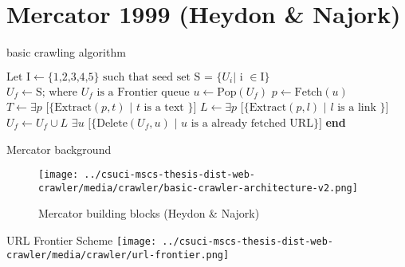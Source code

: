 \documentclass[9pt]{beamer}
\begin{document}

\section[Mercator]{Mercator 1999 (Heydon \& Najork)}
\begin{frame}[plain]
\end{frame}


\begin{frame}{basic crawling algorithm}
  \begin{algorithm}[H]
    \begin{algorithmic}[1]
      \State $\text{Let I} \gets \text{\{1,2,3,4,5\}} \text{ such that seed set S = \{} U_i \text{| i } \in \text{I\}}$
      \State $U_f \gets \text{S; where } U_f \text{ is a Frontier queue}$
      \State $u \gets \text{Pop}(U_f)$ 
      \State $p \gets \text{Fetch}(u)$
      \State $T \gets \exists p\text{ [\{Extract}(p, t) \text{ | } t \text{ is a text \}]}$
      \State $L \gets \exists p\text{ [\{Extract}(p, l) \text{ | } l \text{ is a link \}]}$
      \State $U_f \gets U_f \cup L$
      \State $\exists u\text{ [\{Delete}(U_f, u) \text{ | } u \text{ is a already fetched URL\}]}$
      \EndWhile
      \EndProcedure
      \State \textbf{end}
    \end{algorithmic}
  \end{algorithm}
\end{frame}


\begin{frame}{Mercator background}
  \centering
  \begin{figure}
  \texttt{[image: ../csuci-mscs-thesis-dist-web-crawler/media/crawler/basic-crawler-architecture-v2.png]}
  \caption{Mercator building blocks (Heydon \& Najork)}
  \end{figure}
\end{frame}


\begin{frame}{URL Frontier Scheme}
  \centering
  \texttt{[image: ../csuci-mscs-thesis-dist-web-crawler/media/crawler/url-frontier.png]}
\end{frame}
\end{document}
